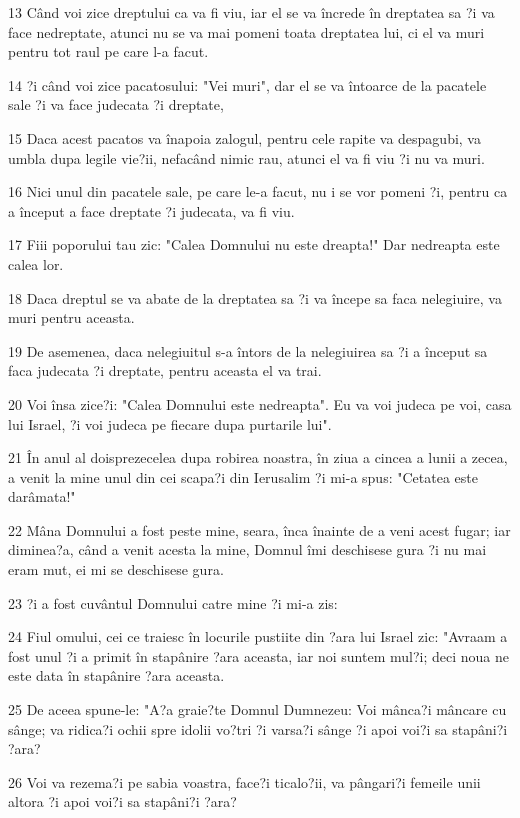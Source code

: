 \par 13 Când voi zice dreptului ca va fi viu, iar el se va încrede în dreptatea sa ?i va face nedreptate, atunci nu se va mai pomeni toata dreptatea lui, ci el va muri pentru tot raul pe care l-a facut.
\par 14 ?i când voi zice pacatosului: "Vei muri", dar el se va întoarce de la pacatele sale ?i va face judecata ?i dreptate,
\par 15 Daca acest pacatos va înapoia zalogul, pentru cele rapite va despagubi, va umbla dupa legile vie?ii, nefacând nimic rau, atunci el va fi viu ?i nu va muri.
\par 16 Nici unul din pacatele sale, pe care le-a facut, nu i se vor pomeni ?i, pentru ca a început a face dreptate ?i judecata, va fi viu.
\par 17 Fiii poporului tau zic: "Calea Domnului nu este dreapta!" Dar nedreapta este calea lor.
\par 18 Daca dreptul se va abate de la dreptatea sa ?i va începe sa faca nelegiuire, va muri pentru aceasta.
\par 19 De asemenea, daca nelegiuitul s-a întors de la nelegiuirea sa ?i a început sa faca judecata ?i dreptate, pentru aceasta el va trai.
\par 20 Voi însa zice?i: "Calea Domnului este nedreapta". Eu va voi judeca pe voi, casa lui Israel, ?i voi judeca pe fiecare dupa purtarile lui".
\par 21 În anul al doisprezecelea dupa robirea noastra, în ziua a cincea a lunii a zecea, a venit la mine unul din cei scapa?i din Ierusalim ?i mi-a spus: "Cetatea este darâmata!"
\par 22 Mâna Domnului a fost peste mine, seara, înca înainte de a veni acest fugar; iar diminea?a, când a venit acesta la mine, Domnul îmi deschisese gura ?i nu mai eram mut, ei mi se deschisese gura.
\par 23 ?i a fost cuvântul Domnului catre mine ?i mi-a zis:
\par 24 Fiul omului, cei ce traiesc în locurile pustiite din ?ara lui Israel zic: "Avraam a fost unul ?i a primit în stapânire ?ara aceasta, iar noi suntem mul?i; deci noua ne este data în stapânire ?ara aceasta.
\par 25 De aceea spune-le: "A?a graie?te Domnul Dumnezeu: Voi mânca?i mâncare cu sânge; va ridica?i ochii spre idolii vo?tri ?i varsa?i sânge ?i apoi voi?i sa stapâni?i ?ara?
\par 26 Voi va rezema?i pe sabia voastra, face?i ticalo?ii, va pângari?i femeile unii altora ?i apoi voi?i sa stapâni?i ?ara?
